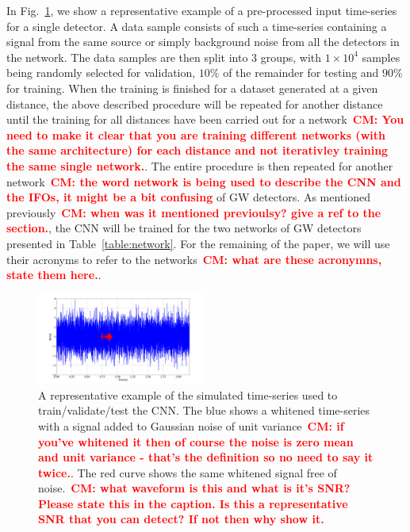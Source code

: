 \documentclass[aps,twocolumn,showpacs,groupedaddress, nofootinbib]{revtex4}  %
\newcommand{\cm}[1]{\textbf{\textcolor{red}{CM: #1}}}
\begin{document}
%
%
In Fig.~\ref{fig:sample}, we show a representative example of a pre-processed
input time-series for a single detector. A data sample consists of such a
time-series containing a signal from the same source or simply background noise
from all the detectors in the network. The data samples are then split into 3
groups, with $1\times10^{4}$ samples being randomly selected for validation,
$10\%$ of the remainder for testing and $90\%$ for training. When the training
is finished for a dataset generated at a given distance, the above described
procedure will be repeated for another distance until the training for all
distances have been carried out for a network~\cm{You need to make it clear
that you are training different networks (with the same architecture) for each
distance and not iterativley training the same single network.}. The entire
procedure is then repeated for another network~\cm{the word network is being
used to describe the CNN and the IFOs, it might be a bit confusing} of \ac{GW}
detectors. As mentioned previously~\cm{when was it mentioned previoulsy? give a
ref to the section.}, the \ac{CNN} will be trained for the two networks of
\ac{GW} detectors presented in Table~\ref{table:network}. For the remaining of
the paper, we will use their acronyms to refer to the networks~\cm{what are
these acronymns, state them here.}.

%
%
\begin{figure}
\includegraphics[width=0.5\textwidth]{datasample.png}
\caption{A representative example of the simulated time-series used to
train/validate/test the \ac{CNN}. The blue shows a whitened time-series with a
signal added to Gaussian noise of unit variance~\cm{if you've whitened it then
of course the noise is zero mean and unit variance - that's the definition so
no need to say it twice.}. The red curve shows the same whitened signal free of
noise.~\cm{what waveform is this and what is it's SNR? Please state this in the
caption. Is this a representative SNR that you can detect? If not then why show
it.}\label{fig:sample}} 
\end{figure}
\end{document}
